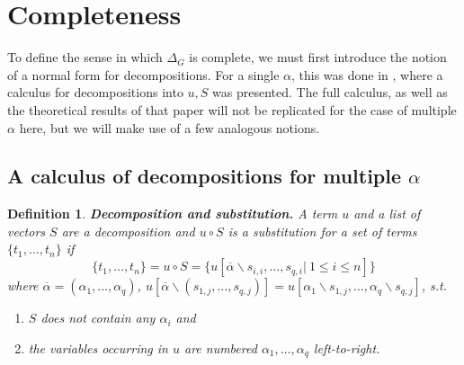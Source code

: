 \documentclass[a4paper, 11pt]{report}
\newtheorem{definition}{Definition}
\begin{document}
\section{Completeness}

To define the sense in which $\Delta_G$ is complete, we must first introduce the notion of a normal form for decompositions. For a single $\alpha$, this was done in \cite[Sect. 4]{Hetzl2012}, where a calculus for decompositions into $u,S$ was presented. The full calculus, as well as the theoretical results of that paper will not be replicated for the case of multiple $\alpha$ here, but we will make use of a few analogous notions.

\subsection{A calculus of decompositions for multiple $\alpha$}

\begin{definition}
  \textbf{Decomposition and substitution.}
  A term $u$ and a list of vectors $S$ are a decomposition and $u \circ S$ is a substitution for a set of terms $\{t_1,\dots,t_n\}$ if
  $$
    \{t_1,\dots,t_n\} =
    u \circ S =
    \{ u[\overline{\alpha} \backslash s_{i,i}, \dots, s_{q,i} |\ 1 \leq i \leq n]  \}
  $$
  where $\overline{\alpha} = (\alpha_1,\dots,\alpha_q)$, $u[\overline{\alpha}\backslash(s_{1,j},\dots,s_{q,j})] = u[\alpha_1\backslash s_{1,j},\dots,\alpha_q\backslash s_{q,j}]$, s.t.
  \begin{enumerate}
    \item $S$ does not contain any $\alpha_i$ and
    \item the variables occurring in $u$ are numbered $\alpha_1,\dots,\alpha_q$ left-to-right.
  \end{enumerate}
\end{definition}
\end{document}
